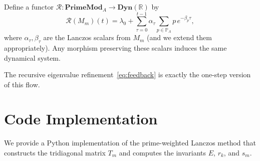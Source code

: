 \documentclass[12pt]{article}
\theoremstyle{plain}
\theoremstyle{definition}
\theoremstyle{remark}
\begin{document}
Define a functor $\mathcal{R} : \mathbf{PrimeMod}_A \to \mathbf{Dyn}(\mathbb{R})$ by
\[
\mathcal{R}(M_m)(t) = \lambda_0 + \sum_{\tau=0}^{t-1} \alpha_\tau \sum_{p\in\mathbb{P}_A} p\, e^{-\beta_p \tau},
\]
where $\alpha_\tau,\beta_\tau$ are the Lanczos scalars from $M_m$ (and we extend them appropriately). 
Any morphism preserving these scalars induces the same dynamical system.

The recursive eigenvalue refinement~\eqref{eq:feedback} is exactly the one-step version of this flow.

\section{Code Implementation}\label{sec:code}
We provide a Python implementation of the prime-weighted Lanczos method that constructs the tridiagonal matrix $T_m$ and computes the invariants $E$, $r_k$, and $s_m$.
\end{document}
